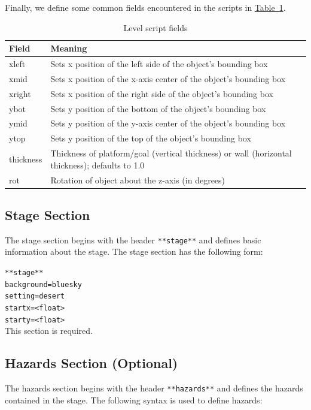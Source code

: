 \documentclass[12pt, titlepage]{article}
\begin{document}
Finally, we define some common fields encountered in the scripts in \hyperref[tab:fields]{Table~\ref*{tab:fields}}.

\begin{table}[h]
\caption{Level script fields} \label{tab:fields}
\centering
\begin{tabularx}{\textwidth}{p{2cm}X}
\toprule {\bf Field} & {\bf Meaning}\\
\midrule
xleft & Sets x position of the left side of the object's bounding box\\
 xmid & Sets x position of the x-axis center of the object's bounding box\\
 xright & Sets x position of the right side of the object's bounding box\\
 ybot & Sets y position of the bottom of the object's bounding box\\
 ymid & Sets y position of the y-axis center of the object's bounding box\\
 ytop & Sets y position of the top of the object's bounding box\\
 thickness & Thickness of platform/goal (vertical thickness) or wall (horizontal thickness);  defaults to 1.0\\
 rot & Rotation of object about the z-axis (in degrees)\\
\bottomrule
\end{tabularx}
\end{table}

\FloatBarrier



\subsection{Stage Section}
The stage section begins with the header \texttt{**stage**} and defines basic information about the stage.  The stage section has the following form:

\noindent ${}$\qquad \texttt{**stage**}\\
${}$\qquad \texttt{background=bluesky}\\
${}$\qquad \texttt{setting=desert}\\
${}$\qquad \texttt{startx=<float>}\\
${}$\qquad \texttt{starty=<float>}\\

\noindent This section is required.



\subsection{Hazards Section (Optional)}
The hazards section begins with the header \texttt{**hazards**} and defines the hazards contained in the stage.  The following syntax is used to define hazards:\\
\end{document}
